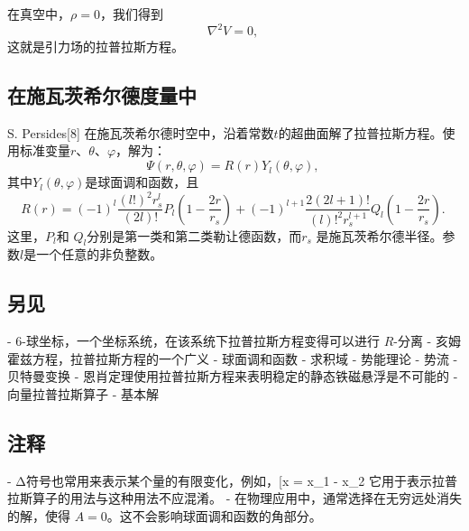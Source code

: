 在真空中，\( \rho = 0 \)，我们得到
\[
\nabla^2 V = 0,~
\]
这就是引力场的拉普拉斯方程。
\subsection{在施瓦茨希尔德度量中}  
S. Persides[8] 在施瓦茨希尔德时空中，沿着常数\( t \)的超曲面解了拉普拉斯方程。使用标准变量\( r \)、\( \theta \)、\( \varphi \)，解为：
\[
\Psi (r, \theta, \varphi) = R(r) Y_l(\theta, \varphi),~
\]
其中\( Y_l(\theta, \varphi) \)是球面调和函数，且
\[
R(r) = (-1)^l \frac{(l!)^2 r_s^l}{(2l)!} P_l \left( 1 - \frac{2r}{r_s} \right) + (-1)^{l+1} \frac{2(2l+1)!}{(l)!^2 r_s^{l+1}} Q_l \left( 1 - \frac{2r}{r_s} \right).~
\]
这里，\( P_l \)和 \( Q_l \)分别是第一类和第二类勒让德函数，而\( r_s \) 是施瓦茨希尔德半径。参数\( l \)是一个任意的非负整数。
\subsection{另见}  
- 6-球坐标，一个坐标系统，在该系统下拉普拉斯方程变得可以进行 \( R \)-分离  
- 亥姆霍兹方程，拉普拉斯方程的一个广义  
- 球面调和函数  
- 求积域  
- 势能理论  
- 势流  
- 贝特曼变换  
- 恩肖定理使用拉普拉斯方程来表明稳定的静态铁磁悬浮是不可能的  
- 向量拉普拉斯算子  
- 基本解  

\subsection{注释}  
- Δ符号也常用来表示某个量的有限变化，例如，[\Delta x = x_1 - x_2\)  
它用于表示拉普拉斯算子的用法与这种用法不应混淆。  
- 在物理应用中，通常选择在无穷远处消失的解，使得 \( A = 0 \)。这不会影响球面调和函数的角部分。